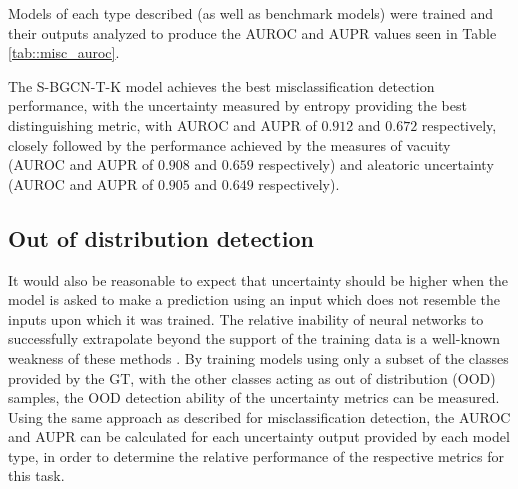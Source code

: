 \documentclass[
twocolumn,
]{ceurart}
\begin{document}
Models of each type described (as well as benchmark models) were trained and their outputs analyzed to produce the AUROC and AUPR values seen in Table \ref{tab::misc_auroc}.


The S-BGCN-T-K model achieves the best misclassification detection performance, with the uncertainty measured by entropy providing the best distinguishing metric, with AUROC and AUPR of $0.912$ and $0.672$ respectively, closely followed by the performance achieved by the measures of vacuity (AUROC and AUPR of $0.908$ and $0.659$ respectively) and aleatoric uncertainty (AUROC and AUPR of $0.905$ and $0.649$ respectively).

\subsection{Out of distribution detection}

It would also be reasonable to expect that uncertainty should be higher when the model is asked to make a prediction using an input which does not resemble the inputs upon which it was trained.
The relative inability of neural networks to successfully extrapolate beyond the support of the training data is a well-known weakness of these methods \cite{Lakshminarayanan2017}.
By training models using only a subset of the classes provided by the GT, with the other classes acting as out of distribution (OOD) samples, the OOD detection ability of the uncertainty metrics can be measured.
Using the same approach as described for misclassification detection, the AUROC and AUPR can be calculated for each uncertainty output provided by each model type, in order to determine the relative performance of the respective metrics for this task.
\end{document}
